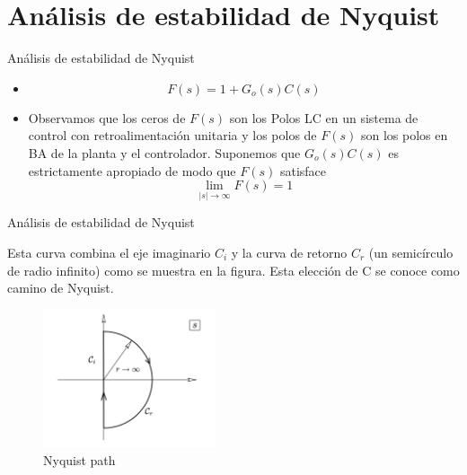 \documentclass{beamer}
\begin{document}
\section{Análisis de estabilidad de Nyquist}
\begin{frame}{Análisis de estabilidad de Nyquist}
\begin{justify}

\begin{itemize}
    \justifying
    Esto tiene una conexión directa con la cuestión de la estabilidad del circuito cerrado. Para aplicar este resultado, consideramos una función especial $F(s)$, relacionada con la FT en lazo abierto de la planta, $G_o$, y un controlador $C(s)$ mediante la relación simple:
    \vspace{0.2cm} 
    \item 
    \[F (s) = 1 + G_o(s)C(s)\]
    \vspace{0.2cm} 
    \item 
    Observamos que los ceros de $F(s)$ son los Polos LC en un sistema de control con retroalimentación unitaria y los polos de $F(s)$ son los polos en BA de la planta y el controlador.
    Suponemos que $G_o(s)C(s)$ es estrictamente apropiado de modo que $F(s)$ satisface
    \[\lim_{\left | s \right | \to \infty } F(s)=1\]
\end{itemize}

\end{justify}
\end{frame}

\begin{frame}{Análisis de estabilidad de Nyquist}
\begin{justify}
\begin{itemize}
     \justifying
     Esta curva combina el eje imaginario $C_i$ y la curva de retorno $C_r$ (un semicírculo de radio infinito) como se muestra en la figura. Esta elección de C se conoce como camino de Nyquist.
    \begin{figure}[H]
    \centering
    \includegraphics[width=2in]{imagenes/nyquist-path.png}
    \caption{Nyquist path}
    \label{niquist-function}
    \end{figure}
\end{itemize}

\end{justify}
\end{frame}
\end{document}
